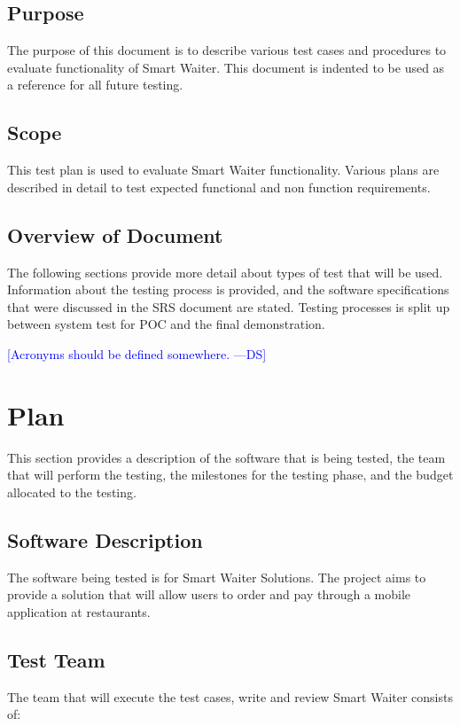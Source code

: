 \documentclass[12pt]{article}
\newcommand{\authornote}[3]{\textcolor{#1}{[#3 ---#2]}}
\newcommand{\authornote}[3]{}
\newcommand{\ds}[1]{\authornote{blue}{DS}{#1}}
\begin{document}
\subsection{Purpose}
The purpose of this document is to describe  various test cases and procedures to evaluate functionality of Smart Waiter.
This document is indented to be used as a reference for all future testing. 

\subsection{Scope}
This test plan is used to evaluate Smart Waiter functionality. Various plans are described in detail to test expected functional and non function requirements.  

\subsection{Overview of Document }
The following sections provide more detail about types of test that will be used. Information about the testing process is provided, and the software specifications
that were discussed in the SRS document are stated. Testing processes is split up between system test for POC and the final demonstration. 

\ds{Acronyms should be defined somewhere.}

%
%

\section{Plan}
This section provides a description of the software that is being tested, the team that will
perform the testing, the milestones for the testing phase, and the budget allocated to the testing. 

\subsection{Software Description}
The software being tested is for Smart Waiter Solutions. The project aims to provide a solution that will allow users to order and pay through a mobile application at restaurants. 

\subsection{Test Team} 
The team that will execute the test cases, write and review Smart Waiter consists of:
\end{document}
